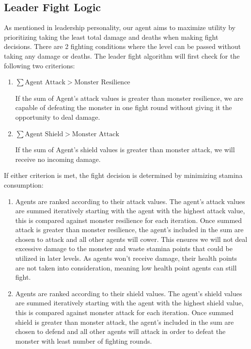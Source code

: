 \subsection{Leader Fight Logic}
As mentioned in leadership personality, our agent aims to maximize utility by prioritizing taking the least total damage and deaths when making fight decisions. There are 2 fighting conditions where the level can be passed without taking any damage or deaths. The leader fight algorithm will first check for the following two criterions:

\begin{enumerate}
    \item
          $\sum{\text{Agent Attack}} > \text{Monster Resilience}$

          If the sum of Agent's attack values is greater than monster resilience, we are capable of defeating the monster in one fight round without giving it the opportunity to deal damage.

    \item
          $\sum{\text{Agent Shield}} > \text{Monster Attack}$

          If the sum of Agent's shield values is greater than monster attack, we will receive no incoming damage.
\end{enumerate}

If either criterion is met, the fight decision is determined by minimizing stamina consumption:

\begin{enumerate}
    \item  Agents are ranked according to their attack values. The agent's attack values are summed iteratively starting with the agent with the highest attack value, this is compared against monster resilience for each iteration. Once summed attack is greater than monster resilience, the agent's included in the sum are chosen to attack and all other agents will cower. This ensures we will not deal excessive damage to the monster and waste stamina points that could be utilized in later levels. As agents won't receive damage, their health points are not taken into consideration, meaning low health point agents can still fight.
    \item  Agents are ranked according to their shield values. The agent's shield values are summed iteratively starting with the agent with the highest shield value, this is compared against monster attack for each iteration. Once summed shield is greater than monster attack, the agent's included in the sum are chosen to defend and all other agents will attack in order to defeat the monster with least number of fighting rounds.
\end{enumerate}

